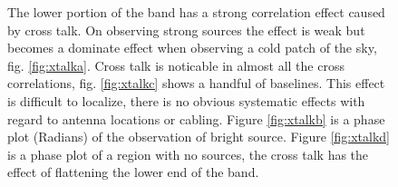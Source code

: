 \documentclass[useAMS,macros,usenatbib,onecolumn]{mn2e}
\begin{document}
\begin{figure}
    \centering

    \caption{The lower portion of the band has a strong correlation effect caused by cross talk.
    On observing strong sources the effect is weak but becomes a dominate effect when observing a cold patch of the sky, fig. \ref{fig:xtalka}.
    Cross talk is noticable in almost all the cross correlations, fig. \ref{fig:xtalkc} shows a handful of baselines.
    This effect is difficult to localize, there is no obvious systematic effects with regard to antenna locations or cabling.
    Figure \ref{fig:xtalkb} is a phase plot (Radians) of the observation of bright source.
    Figure \ref{fig:xtalkd} is a phase plot of a region with no sources, the cross talk has the effect of flattening the lower end of the band.}
    \label{fig:xtalk}
\end{figure}
\end{document}
